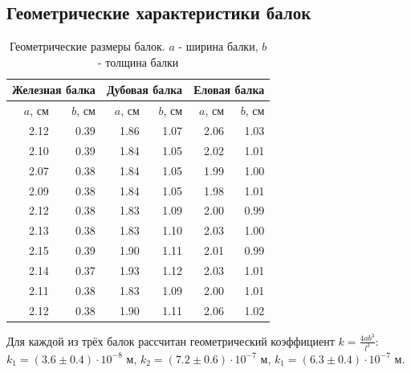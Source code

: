\documentclass[12pt]{article}
\begin{document}
\subsection{Геометрические характеристики балок} \label{app_1}
\begin{table}[H]
    \centering
    \begin{tabular}{|r|r|r|r|r|r|}
        \hline
        \multicolumn{2}{|c|}{Железная балка} & 
        \multicolumn{2}{|c|}{Дубовая балка}  & 
        \multicolumn{2}{|c|}{Еловая балка}                                                     \\
        \hline
        $a$, см                              & $b$, см & $a$, см & $b$, см & $a$, см & $b$, см \\
        \hline
        2.12                                 & 0.39    & 1.86    & 1.07    & 2.06    & 1.03    \\
        2.10                                 & 0.39    & 1.84    & 1.05    & 2.02    & 1.01    \\
        2.07                                 & 0.38    & 1.84    & 1.05    & 1.99    & 1.00    \\
        2.09                                 & 0.38    & 1.84    & 1.05    & 1.98    & 1.01    \\
        2.12                                 & 0.38    & 1.83    & 1.09    & 2.00    & 0.99    \\
        2.13                                 & 0.38    & 1.83    & 1.10    & 2.03    & 1.00    \\
        2.15                                 & 0.39    & 1.90    & 1.11    & 2.01    & 0.99    \\
        2.14                                 & 0.37    & 1.93    & 1.12    & 2.03    & 1.01    \\
        2.11                                 & 0.38    & 1.83    & 1.09    & 2.00    & 1.01    \\
        2.12                                 & 0.38    & 1.90    & 1.11    & 2.06    & 1.02    \\
        \hline
    \end{tabular}
    
    \caption{Геометрические размеры балок. $a$ - ширина балки, $b$ - толщина балки}
    \label{tab:1}
\end{table}
Для каждой из трёх балок рассчитан геометрический коэффициент $k = \frac{4ab^3}{l^3}$: $k_1 = (3.6 \pm 0.4) \cdot 10^{-8}$ м, $k_2 = (7.2 \pm 0.6) \cdot 10^{-7}$ м,
$k_1 = (6.3 \pm 0.4) \cdot 10^{-7}$ м.
\end{document}
